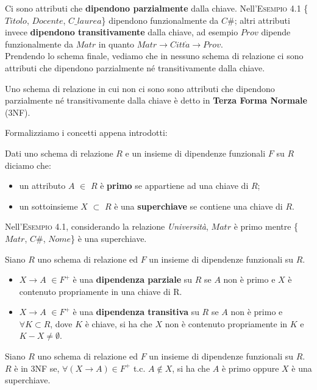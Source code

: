Ci sono attributi che \textbf{dipendono parzialmente} dalla chiave. Nell'\textsc{Esempio 4.1} 
\{$Titolo$, $Docente$, $C\_laurea$\} dipendono funzionalmente da $C\#$; altri attributi
invece \textbf{dipendono transitivamente} dalla chiave, ad esempio $Prov$ dipende
funzionalmente da $Matr$ in quanto $Matr \rightarrow Citt\grave{a} \rightarrow Prov$.\\
Prendendo lo schema finale, vediamo che in nessuno schema di relazione ci sono attributi
che dipendono parzialmente né transitivamente dalla chiave. 
\begin{prop}
Uno schema di relazione in cui non ci sono sono attributi che dipendono parzialmente né 
transitivamente dalla chiave è detto in \textbf{Terza Forma Normale} (3NF). 
\end{prop}
Formalizziamo i concetti appena introdotti:
\begin{defn}
 Dati uno schema di relazione $R$ e un insieme di dipendenze funzionali $F$ su $R$
diciamo che:
\begin{itemize}
 \item un attributo $A$ $\in$ $R$ è \textbf{primo} se appartiene ad una chiave di $R$;
 \item un sottoinsieme $X$ $\subset$ $R$ è una \textbf{superchiave} se contiene una 
 chiave di $R$.
\end{itemize}
\end{defn}
Nell'\textsc{Esempio 4.1}, considerando la relazione \emph{Università}, $Matr$ è primo mentre
 \{$Matr$, $C\#$, $Nome$\} è una superchiave.
\begin{defn}
Siano $R$ uno schema di relazione ed $F$ un insieme di dipendenze funzionali su $R$.
\begin{itemize}
 \item $X\rightarrow A$ $\in F^+$ è una \textbf{dipendenza parziale} su $R$ se $A$ non 
 è primo e $X$ è contenuto propriamente in una chiave di R.
 \item $X\rightarrow A$ $\in F^+$ è una \textbf{dipendenza transitiva} su $R$ se $A$ 
 non è primo e $\forall K \subset R$, dove $K$ è chiave, si ha che $X$ non è contenuto propriamente 
 in $K$ e $K-X \neq \emptyset$.
\end{itemize}
\end{defn}
\begin{defn}
Siano $R$ uno schema di relazione ed $F$ un insieme di dipendenze funzionali su $R$. 
$R$ è in 3NF se, $\forall (X\rightarrow A) \in F^+$ t.c. $A\notin X$, si ha che $A$ è
primo oppure $X$ è una superchiave.
\end{defn}
